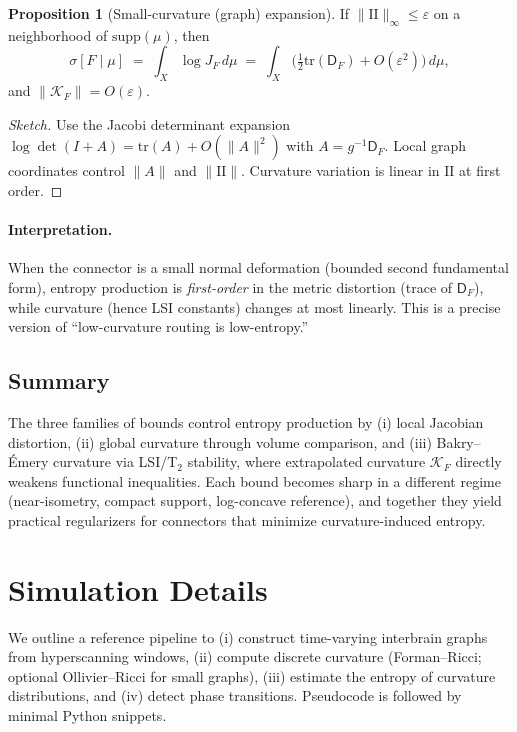 \documentclass{article}
\theoremstyle{definition}
\newtheorem{proposition}[theorem]{Proposition}
\begin{document}
\begin{proposition}[Small-curvature (graph) expansion]
\label{prop:graph-entropy}
If \(\|\mathrm{II}\|_\infty \le \varepsilon\) on a neighborhood of \(\mathrm{supp}(\mu)\),
then
\[
\sigma[F\mid \mu] \;=\; \int_X \log J_F\, d\mu
\;=\; \int_X \Big(\tfrac{1}{2}\mathrm{tr}(\mathsf{D}_F) + O(\varepsilon^2)\Big)\, d\mu,
\]
and
\(
\|\mathcal{K}_F\| = O(\varepsilon).
\)
\end{proposition}

\begin{proof}[Sketch]
Use the Jacobi determinant expansion
\(\log\det(I+A)=\mathrm{tr}(A)+O(\|A\|^2)\) with
\(A=g^{-1}\mathsf{D}_F\). Local graph coordinates control \(\|A\|\) and \(\|\mathrm{II}\|\).
Curvature variation is linear in \(\mathrm{II}\) at first order.
\end{proof}

\paragraph{Interpretation.}
When the connector is a small normal deformation (bounded second fundamental
form), entropy production is \emph{first-order} in the metric distortion
(trace of \(\mathsf{D}_F\)), while curvature (hence LSI constants) changes at
most linearly. This is a precise version of ``low-curvature routing is
low-entropy.''

\subsection{Summary}
The three families of bounds control entropy production by (i) local Jacobian
distortion, (ii) global curvature through volume comparison, and (iii)
Bakry--Émery curvature via LSI/T\(_2\) stability, where extrapolated curvature
\(\mathcal{K}_F\) directly weakens functional inequalities. Each bound becomes
sharp in a different regime (near-isometry, compact support, log-concave
reference), and together they yield practical regularizers for connectors that
minimize curvature-induced entropy.

\section{Simulation Details}
\label{sec:sim-details}

We outline a reference pipeline to (i) construct time-varying interbrain graphs
from hyperscanning windows, (ii) compute discrete curvature (Forman--Ricci; optional
Ollivier--Ricci for small graphs), (iii) estimate the entropy of curvature distributions,
and (iv) detect phase transitions. Pseudocode is followed by minimal Python snippets.
\end{document}
